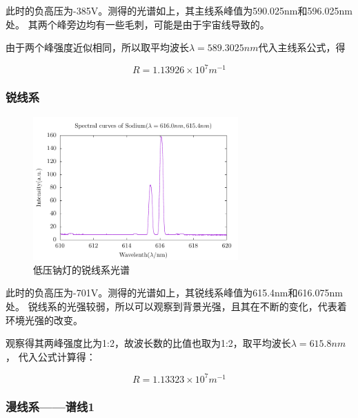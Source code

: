\documentclass[a4paper,UTF8]{ctexart}
\begin{document}
此时的负高压为-385V。测得的光谱如上，其主线系峰值为590.025nm和596.025nm处。
其两个峰旁边均有一些毛刺，可能是由于宇宙线导致的。

由于两个峰强度近似相同，所以取平均波长$\lambda = 589.3025nm$代入主线系公式，得

\begin{equation}
    R = 1.13926 \times 10^7 m^{-1}
\end{equation}

\subsubsection{锐线系}

\begin{figure}[H]
    \centering
    \begin{minipage}[b]{0.9\textwidth}
        \centering
        \includegraphics[width=0.7\textwidth]{./na_1.pdf}
        \caption{低压钠灯的锐线系光谱}
    \end{minipage}
\end{figure}

此时的负高压为-701V。测得的光谱如上，其锐线系峰值为615.4nm和616.075nm处。
锐线系的光强较弱，所以可以观察到背景光强，且其在不断的变化，代表着环境光强的改变。

观察得其两峰强度比为1:2，故波长数的比值也取为1:2，取平均波长$\lambda = 615.8nm$，
代入公式计算得：

\begin{equation}
    R = 1.13323 \times 10^7 m^{-1}
\end{equation}

\subsubsection{漫线系——谱线1}
\end{document}
